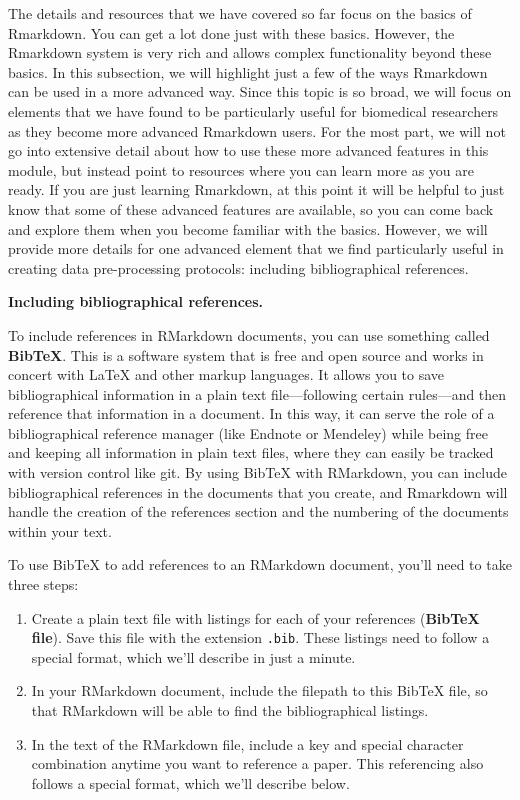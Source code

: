 \documentclass[]{tufte-book}
\providecommand{\tightlist}{%
  \setlength{\itemsep}{0pt}\setlength{\parskip}{0pt}}
\begin{document}
The details and resources that we have covered so far focus on the basics of
Rmarkdown. You can get a lot done just with these basics. However, the Rmarkdown
system is very rich and allows complex functionality beyond these basics. In
this subsection, we will highlight just a few of the ways Rmarkdown can be used
in a more advanced way. Since this topic is so broad, we will focus on elements
that we have found to be particularly useful for biomedical researchers as they
become more advanced Rmarkdown users. For the most part, we will not go into
extensive detail about how to use these more advanced features in this module,
but instead point to resources where you can learn more as you are ready. If you
are just learning Rmarkdown, at this point it will be helpful to just know that
some of these advanced features are available, so you can come back and explore
them when you become familiar with the basics. However, we will provide more
details for one advanced element that we find particularly useful in creating data
pre-processing protocols: including bibliographical references.

\textbf{Including bibliographical references.}

To include references in RMarkdown documents, you can use something called
\textbf{BibTeX}. This is a software system that is free and open source and works in
concert with LaTeX and other markup languages. It allows you to save bibliographical information in a plain
text file---following certain rules---and then reference that information in a
document. In this way, it can serve the role of a bibliographical reference
manager (like Endnote or Mendeley) while being free and keeping all information
in plain text files, where they can easily be tracked with version control like
git. By using BibTeX with RMarkdown, you can include bibliographical references
in the documents that you create, and Rmarkdown will handle the creation of the
references section and the numbering of the documents within your text.

To use BibTeX to add references to an RMarkdown document, you'll need to take
three steps:

\begin{enumerate}
\def\labelenumi{\arabic{enumi}.}
\tightlist
\item
  Create a plain text file with listings for each of
  your references (\textbf{BibTeX file}). Save this file with the
  extension \texttt{.bib}. These listings need to follow a special format, which
  we'll describe in just a minute.
\item
  In your RMarkdown document, include the filepath
  to this BibTeX file, so that RMarkdown will be able to find the bibliographical
  listings.
\item
  In the text of the RMarkdown file, include a key and special character
  combination anytime you want to reference a paper. This referencing also
  follows a special format, which we'll describe below.
\end{enumerate}
\end{document}
